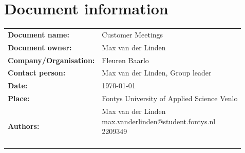\documentclass[12pt]{article}
\begin{document}

\clearpage

\section*{Document information}
\begin{tabular}{ll}
	\textbf{Document name:} & Customer Meetings\\
	\textbf{Document owner:} & Max van der Linden \\
	\textbf{Company/Organisation:} & Fleuren Baarlo \\
	\textbf{Contact person:} & Max van der Linden, Group leader \\
	\textbf{Date:} & \today \\
	\textbf{Place:} & Fontys University of Applied Science Venlo \\
	\textbf{Authors:} & \parbox[t]{5cm}{
		Max van der Linden\\ max.vanderlinden@student.fontys.nl\\ 2209349 \\ \\}
\end{tabular}
\end{document}
